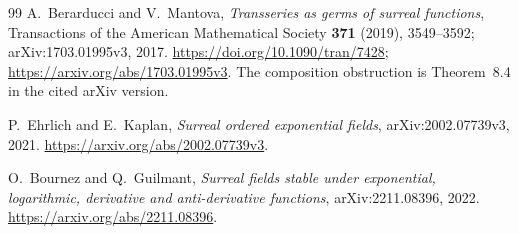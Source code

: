 \documentclass[11pt]{article}
\numberwithin{equation}{section}
\theoremstyle{definition}
\begin{document}
\begin{thebibliography}{99}
A.~Berarducci and V.~Mantova,
\emph{Transseries as germs of surreal functions},
Transactions of the American Mathematical Society \textbf{371} (2019),
3549--3592; arXiv:1703.01995v3, 2017.
\url{https://doi.org/10.1090/tran/7428};
\url{https://arxiv.org/abs/1703.01995v3}.
The composition obstruction is Theorem~8.4 in the cited arXiv version.

P.~Ehrlich and E.~Kaplan,
\emph{Surreal ordered exponential fields},
arXiv:2002.07739v3, 2021.
\url{https://arxiv.org/abs/2002.07739v3}.

O.~Bournez and Q.~Guilmant,
\emph{Surreal fields stable under exponential, logarithmic, derivative
and anti-derivative functions}, arXiv:2211.08396, 2022.
\url{https://arxiv.org/abs/2211.08396}.

\end{thebibliography}
\end{document}
